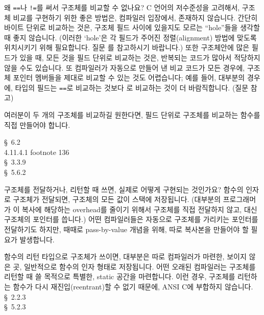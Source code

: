 \begin{faq}
        왜 \verb+==+나 \verb+!=+를 써서 구조체를 비교할 수 없나요?
\A
        C 언어의 저수준성을 고려해서, 구조체 비교를 구현하기 위한 좋은 방법은,
        컴파일러 입장에서, 존재하지 않습니다. 간단히 바이트 단위로 
	비교하는 것은, 구조체 필드 사이에 있을지도 모르는 ``hole''들을 생각할 때 좋지
	않습니다. (이러한 `hole'은 각 필드가 주어진 정렬(alignment) 방법에
	맞도록 위치시키기 위해 필요합니다.  질문 를 참고하시기 바랍니다.)
	또한 구조체안에 많은 필드가 있을 때, 모든 것을 필드 단위로 비교하는 것은,
	반복되는 코드가 많아서 적당하지 않을 수도 있습니다.
        또 컴파일러가 자동으로 만들어 낸 비교 코드가 모든 경우에, 구조체 포인터 멤버들을
        제대로 비교할 수 있는 것도 어렵습니다; 예를 들어, 대부분의 경우에, 
        타입의 필드는 \verb+==+로 비교하는 것보다 로 비교하는 것이 더
        바람직합니다. (질문  참고)

	여러분이 두 개의 구조체를 비교하길 원한다면, 필드 단위로 구조체를
	비교하는 함수를 직접 만들어야 합니다.

\R
	\cite{kr2} \S\ 6.2  \\
        \cite{ansi} 4.11.4.1 footnote 136 \\
	\cite{rationale} \S\ 3.3.9 \\
	\cite{hs} \S\ 5.6.2 
\end{faq}

\begin{faq}
        구조체를 전달하거나, 리턴할 때 쓰면, 실제로 어떻게 구현되는 것인가요?
\A
        함수의 인자로 구조체가 전달되면, 구조체의 모든 값이 스택에 저장됩니다. (대부분의 프로그래머가
        이 복사에 해당하는 overhead를 줄이기 위해서 구조체를 직접 전달하지 않고, 대신 구조체의
        포인터를 씁니다.) 어떤 컴파일러들은 자동으로 구조체를 가리키는 포인터를 전달하기도 하지만,
        때때로 pass-by-value 개념을 위해, 따로 복사본을 만들어야 할 필요가 발생합니다.

        함수의 리턴 타입으로 구조체가 쓰이면, 대부분은 따로 컴파일러가 마련한, 보이지 않은 곳,
        일반적으로 함수의 인자 형태로 저장됩니다. 어떤 오래된 컴파일러는 구조체를 리턴할 때 쓸
        목적으로 특별한, static 공간을 마련합니다. 이런 경우, 구조체를 리턴하는 함수가
        다시 재진입(reentrant)할 수 없기 때문에, ANSI C에 부합하지 않습니다.
\R
        \cite{ansi} \S\ 2.2.3 \\
        \cite{c89} \S\ 5.2.3
\end{faq}

